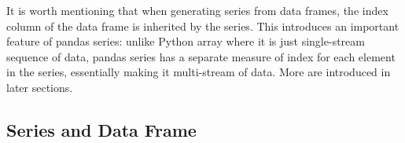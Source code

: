 It is worth mentioning that when generating series from data frames, the index column of the data frame is inherited by the series. This introduces an important feature of pandas series: unlike Python array where it is just single-stream sequence of data, pandas series has a separate measure of index for each element in the series, essentially making it multi-stream of data. More are introduced in later sections.

\subsection{Series and Data Frame}

